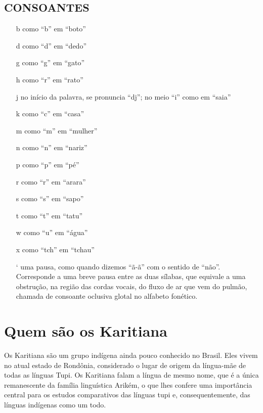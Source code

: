 \section{CONSOANTES}

\begin{itemize}
\item[b] como ``b'' em ``boto''

\item[d] como ``d'' em ``dedo''

\item[g] como ``g'' em ``gato''

\item[h] como ``r'' em ``rato''

\item[j] no início da palavra, se pronuncia ``dj''; no meio ``i'' como em ``saia''

\item[k] como ``c'' em ``casa''

\item[m] como ``m'' em ``mulher''

\item[n] como ``n'' em ``nariz''

\item[p] como ``p'' em ``pé''

\item[r] como ``r'' em ``arara''

\item[s] como ``s'' em ``sapo''

\item[t] como ``t'' em ``tatu''

\item[w] como ``u'' em ``água''

\item[x] como ``tch'' em ``tchau''

\item[`] uma pausa, como quando dizemos ``ã-ã'' com o sentido de ``não''.
Corresponde a uma breve pausa entre as duas sílabas, que equivale a uma
obstrução, na região das cordas vocais, do fluxo de ar que vem do
pulmão, chamada de consoante oclusiva glotal no alfabeto fonético.
\end{itemize}

\chapter{Quem são os Karitiana}

Os Karitiana são um grupo indígena ainda pouco conhecido no Brasil. Eles
vivem no atual estado de Rondônia, considerado o lugar de origem da
língua-mãe de todas as línguas Tupi. Os Karitiana falam a língua de
mesmo nome, que é a única remanescente da família linguística Arikém, o
que lhes confere uma importância central para os estudos comparativos
das línguas tupi e, consequentemente, das línguas indígenas como um
todo.

